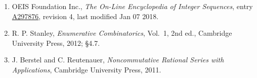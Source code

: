 \documentclass[11pt]{article}
\theoremstyle{definition}
\begin{document}
\begin{enumerate}

\item OEIS Foundation Inc., \emph{The On-Line Encyclopedia of Integer Sequences}, entry \href{https://oeis.org/A297876}{A297876}, revision 4, last modified Jan 07 2018.

\item R. P. Stanley, \emph{Enumerative Combinatorics}, Vol.~1, 2nd ed., Cambridge University Press, 2012; \S4.7.

\item J. Berstel and C. Reutenauer, \emph{Noncommutative Rational Series with Applications}, Cambridge University Press, 2011.

\end{enumerate}
\end{document}
